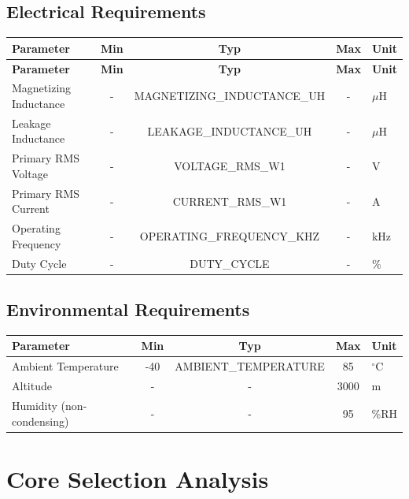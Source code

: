 \documentclass[11pt,a4paper]{article}
\begin{document}
\subsection{Electrical Requirements}
\begin{longtable}{|p{5cm}|c|c|c|l|}
\hline
\textbf{Parameter} & \textbf{Min} & \textbf{Typ} & \textbf{Max} & \textbf{Unit} \\
\hline
\endfirsthead
\hline
\textbf{Parameter} & \textbf{Min} & \textbf{Typ} & \textbf{Max} & \textbf{Unit} \\
\hline
\endhead
Magnetizing Inductance & - & {{MAGNETIZING_INDUCTANCE_UH}} & - & $\mu$H \\
\hline
Leakage Inductance & - & {{LEAKAGE_INDUCTANCE_UH}} & - & $\mu$H \\
\hline
Primary RMS Voltage & - & {{VOLTAGE_RMS_W1}} & - & V \\
\hline
Primary RMS Current & - & {{CURRENT_RMS_W1}} & - & A \\
\hline
Operating Frequency & - & {{OPERATING_FREQUENCY_KHZ}} & - & kHz \\
\hline
Duty Cycle & - & {{DUTY_CYCLE}} & - & \% \\
\hline
\end{longtable}

\subsection{Environmental Requirements}
\begin{longtable}{|p{5cm}|c|c|c|l|}
\hline
\textbf{Parameter} & \textbf{Min} & \textbf{Typ} & \textbf{Max} & \textbf{Unit} \\
\hline
Ambient Temperature & -40 & {{AMBIENT_TEMPERATURE}} & 85 & $^\circ$C \\
\hline
Altitude & - & - & 3000 & m \\
\hline
Humidity (non-condensing) & - & - & 95 & \%RH \\
\hline
\end{longtable}

\section{Core Selection Analysis}
\end{document}

